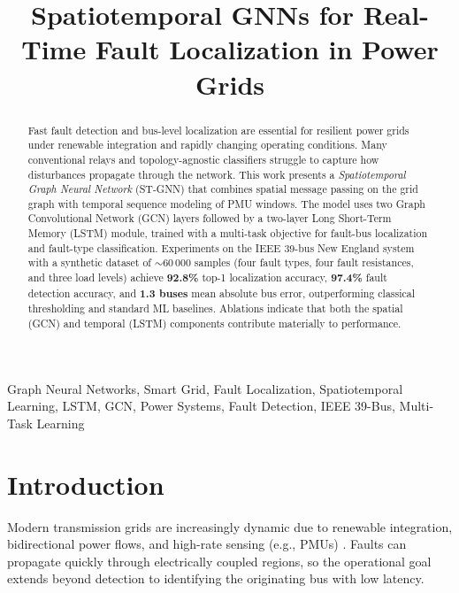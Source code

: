 \documentclass[conference]{IEEEtran}
\begin{document}
\title{Spatiotemporal GNNs for Real-Time Fault Localization in Power Grids}

\author{
}

\maketitle

\begin{abstract}
Fast fault detection and bus-level localization are essential for resilient
power grids under renewable integration and rapidly changing operating conditions.
Many conventional relays and topology-agnostic classifiers struggle to capture how
disturbances propagate through the network. This work presents a
\emph{Spatiotemporal Graph Neural Network} (ST-GNN) that combines spatial message passing
on the grid graph with temporal sequence modeling of PMU windows. The model uses two
Graph Convolutional Network (GCN) layers followed by a two-layer Long Short-Term Memory
(LSTM) module, trained with a multi-task objective for fault-bus localization and
fault-type classification. Experiments on the IEEE 39-bus New England system with a
synthetic dataset of $\sim$60\,000 samples (four fault types, four fault resistances, and
three load levels) achieve \textbf{92.8\%} top-1 localization accuracy, \textbf{97.4\%} fault
detection accuracy, and \textbf{1.3 buses} mean absolute bus error, outperforming classical
thresholding and standard ML baselines. Ablations indicate that both the spatial (GCN)
and temporal (LSTM) components contribute materially to performance.
\end{abstract}

\begin{IEEEkeywords}
Graph Neural Networks, Smart Grid, Fault Localization, Spatiotemporal Learning,
LSTM, GCN, Power Systems, Fault Detection, IEEE 39-Bus, Multi-Task Learning
\end{IEEEkeywords}

\section{Introduction}
\label{sec:intro}
Modern transmission grids are increasingly dynamic due to renewable integration,
bidirectional power flows, and high-rate sensing (e.g., PMUs) \cite{liao2021}. Faults can
propagate quickly through electrically coupled regions, so the operational goal extends
beyond detection to identifying the originating bus with low latency.
\end{document}
